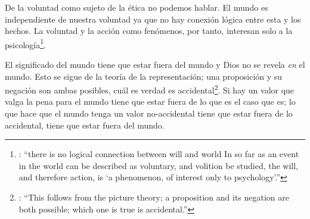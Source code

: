 De la voluntad como sujeto de la ética no podemos hablar\autocite[Cf.~][\S6.423]{wittgenstein1922tractatuses}. El mundo es independiente de nuestra voluntad ya que no hay conexión lógica entre esta y los hechos. La voluntad y la acción como fenómenos, por tanto, interesan solo a la psicología\footnote{\cite[cf.~][171]{anscombe1959iwt}: \enquote{there is no logical connection between will and world \textelp{} In so far as an event in the world can be described as voluntary, and volition be studied, the will, and therefore action, is `a phenomenon, of interest only to psychology'.}}.

 El significado del mundo tiene que estar fuera del mundo\autocite[Cf.~][\S6.41]{wittgenstein1922tractatuses} y Dios no se revela \emph{en} el mundo\autocite[Cf.~][\S6.432]{wittgenstein1922tractatuses}. Esto se sigue de la teoría de la representación; una proposición y su negación son ambas posibles, cuál es verdad es accidental\footnote{\cite[Cf.~][170]{anscombe1959iwt}: \enquote{This follows from the picture theory; a proposition and its negation are both possible; which one is true is accidental.}}. Si hay un valor que valga la pena para el mundo tiene que estar fuera de lo que es el caso que es; lo que hace que el mundo tenga un valor no-accidental tiene que estar fuera de lo accidental, tiene que estar fuera del mundo\autocite[Cf.~][\S6.41]{wittgenstein1922tractatuses}.

